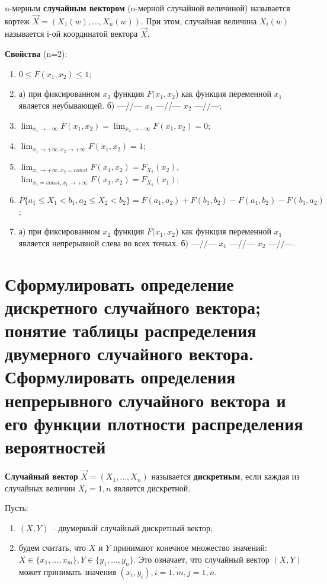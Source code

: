 n-мерным \textbf{случайным вектором} (n-мерной случайной величиной) называется кортеж $\vec{X} = (X_1(w), ..., X_n(w))$. При этом, случайная величина $X_i(w)$ называется i-ой координатой вектора $\vec{X}$.

\textbf{Свойства} (n=2):
\begin{enumerate}
	\item $0 \leq F(x_1, x_2) \leq 1$;
	\item а) при фиксированном $x_2$ функция $F(x_1, x_2$) как функция переменной $x_1$ является неубывающей. б) ---//--- $x_1$ ---//--- $x_2$ ---//---;
	\item $\lim_{x_1 \to -\infty} F(x_1, x_2) = \lim_{x_2 \to -\infty} F(x_1, x_2) = 0$;
	\item $\lim_{x_1 \to +\infty, x_2 \to +\infty} F(x_1, x_2) = 1$;
	\item $\lim_{x_1 \to +\infty, x_2 = const} F(x_1, x_2) = F_{X_2}(x_2)$, $\lim_{x_1 = const, x_1 \to +\infty} F(x_1, x_2) = F_{X_1}(x_1)$;
	\item $P\{a_1 \leq X_1 < b_1, a_2 \leq X_2 < b_2\} = F(a_1, a_2) + F(b_1, b_2) - F(a_1, b_2) - F(b_1, a_2)$;
	\item а) при фиксированном $x_2$ функция $F(x_1, x_2$) как функция переменной $x_1$ является непрерывной слева во всех точках. б) ---//--- $x_1$ ---//--- $x_2$ ---//---.
\end{enumerate}

\section{Сформулировать определение дискретного случайного вектора; понятие таблицы распределения двумерного случайного вектора. Сформулировать определения непрерывного случайного вектора и его функции плотности распределения вероятностей}

\textbf{Случайный вектор} $\vec{X} = (X_1, ..., X_n)$ называется \textbf{дискретным}, если каждая из случайных величин $X_i = \overline{1, n}$ является дискретной.

Пусть:
\begin{enumerate}
	\item $(X, Y)$ -- двумерный случайный дискретный вектор;
	\item будем считать, что $X$ и $Y$ принимают конечное множество значений: $X \in \{x_1, ..., x_m\}, Y \in \{y_1, ..., y_n\}$. Это означает, что случайный вектор $(X, Y)$ может принимать значения $(x_i, y_i), i = \overline{1, m}, j = \overline{1, n}$.
\end{enumerate}

